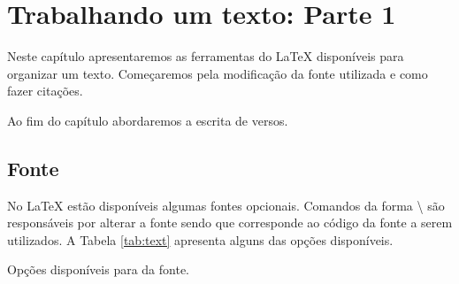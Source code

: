 % 
% 
% 
% 
% 
\chapter{Trabalhando um texto: Parte 1} \label{css:latex:text-basic}
Neste capítulo apresentaremos as ferramentas do LaTeX disponíveis para organizar um texto. Começaremos pela modificação da fonte utilizada e como fazer citações.

Ao fim do capítulo abordaremos a escrita de versos.

\section{Fonte}
No LaTeX estão disponíveis algumas fontes opcionais. Comandos da forma \textbackslash{} são responsáveis por alterar a fonte sendo que  corresponde ao código da fonte a serem utilizados. A Tabela \ref{tab:text} apresenta alguns das opções disponíveis.
\begin{table}[!htb]
    \centering
    \caption{Opções disponíveis para  da fonte.} \label{tab:text}
    
\end{table}

